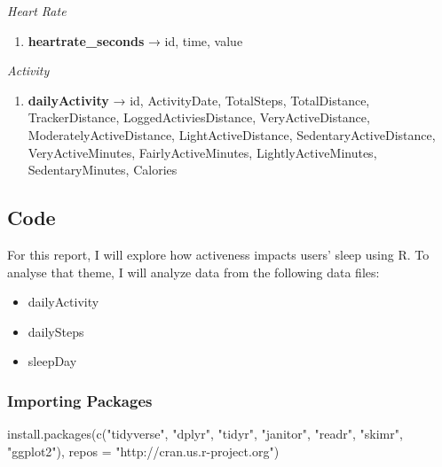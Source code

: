 \documentclass[
]{article}
\newenvironment{Shaded}{\begin{snugshade}}{\end{snugshade}}
\newcommand{\AttributeTok}[1]{\textcolor[rgb]{0.77,0.63,0.00}{#1}}
\newcommand{\FunctionTok}[1]{\textcolor[rgb]{0.00,0.00,0.00}{#1}}
\newcommand{\NormalTok}[1]{#1}
\newcommand{\StringTok}[1]{\textcolor[rgb]{0.31,0.60,0.02}{#1}}
\providecommand{\tightlist}{%
  \setlength{\itemsep}{0pt}\setlength{\parskip}{0pt}}
\begin{document}
\emph{{Heart Rate}}

\begin{enumerate}
\def\labelenumi{\arabic{enumi}.}
\setcounter{enumi}{16}
\tightlist
\item
  \textbf{heartrate\_seconds} → id, time, value
\end{enumerate}

\emph{{Activity}}

\begin{enumerate}
\def\labelenumi{\arabic{enumi}.}
\setcounter{enumi}{17}
\tightlist
\item
  \textbf{dailyActivity} → id, ActivityDate, TotalSteps, TotalDistance,
  TrackerDistance, LoggedActiviesDistance, VeryActiveDistance,
  ModeratelyActiveDistance, LightActiveDistance,
  SedentaryActiveDistance, VeryActiveMinutes, FairlyActiveMinutes,
  LightlyActiveMinutes, SedentaryMinutes, Calories
\end{enumerate}

\hypertarget{code}{%
\subsection{Code}\label{code}}

For this report, I will explore how activeness impacts users' sleep
using R. To analyse that theme, I will analyze data from the following
data files:

\begin{itemize}
\tightlist
\item
  dailyActivity
\item
  dailySteps
\item
  sleepDay
\end{itemize}

\hypertarget{importing-packages}{%
\subsubsection{Importing Packages}\label{importing-packages}}

\begin{Shaded}
\begin{Highlighting}[]
\FunctionTok{install.packages}\NormalTok{(}\FunctionTok{c}\NormalTok{(}\StringTok{"tidyverse"}\NormalTok{, }\StringTok{"dplyr"}\NormalTok{, }\StringTok{"tidyr"}\NormalTok{, }\StringTok{"janitor"}\NormalTok{, }\StringTok{"readr"}\NormalTok{, }\StringTok{"skimr"}\NormalTok{, }\StringTok{"ggplot2"}\NormalTok{), }\AttributeTok{repos =} \StringTok{"http://cran.us.r{-}project.org"}\NormalTok{)}
\end{Highlighting}
\end{Shaded}
\end{document}
